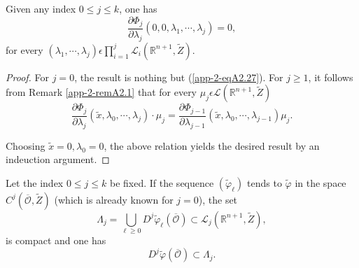 \begin{alphlemma}\label{app-2-lemA2.3}%
Given any index $0 \leq j \leq k$, one has
\begin{equation*}
\frac{\partial \Phi_{j}}{\partial \lambda_{j}} (0, 0, \lambda_{1},
\cdots, \lambda_{j}) = 0,\tag{A2.31}\label{app-2-eqA2.31}
\end{equation*}
for every $(\lambda_{1}, \cdots, \lambda_{j}) \epsilon \prod\limits_{i=1}^{j}
\mathscr{L}_{i} (\mathbb{R}^{n+1}, \widetilde{Z})$.
\end{alphlemma}

\begin{proof}
For $ j = 0$, the result is nothing but (\ref{app-2-eqA2.27}). For $j \geq 1$, it
follows from Remark \ref{app-2-remA2.1} that for every $\mu_{j} \epsilon \mathscr{L}
(\mathbb{R}^{n+1}, \widetilde{Z})$
$$
\frac{\partial \Phi_{j}}{\partial \lambda_{j}} (\widetilde{x},
\lambda_{0}, \cdots, \lambda_{j}) \cdot \mu_{j} = \frac{\partial
  \Phi_{j-1}}{\partial \lambda_{j-1}} (\widetilde{x}, \lambda_{0},
\cdots, \lambda_{j-1}) \mu_{j}.
$$

Choosing $\widetilde{x} = 0, \lambda_{0} = 0$, the above relation
yields the desired result by an indeuction argument.
\end{proof}

\begin{alphlemma}\label{app-2-lemA2.4}%
Let the index $0 \leq  j \leq k $ be fixed. If the sequence
$(\widetilde{\varphi}_{\ell})$ tends to $\widetilde{\varphi}$ in the
space $C^{j}(\overline{\mathscr{O}}, \widetilde{Z})$ (which is already
known for $j = 0$), the set
\begin{equation*}
\Lambda_{j} = \bigcup_{\ell \geq 0} D^{j}\widetilde{\varphi}_{\ell}
(\overline{\mathscr{O}}) \subset \mathscr{L}_{j} (\mathbb{R}^{n+1},
\widetilde{Z}),\tag{A2.32} \label{app-2-eqA2.32}
\end{equation*}
is compact and one has
\begin{equation*}
D^{j}\widetilde{\varphi}(\overline{\mathscr{O}}) \subset \Lambda_{j}.\tag{A2.33}\label{app-2-eqA2.33}
\end{equation*}
\end{alphlemma}

